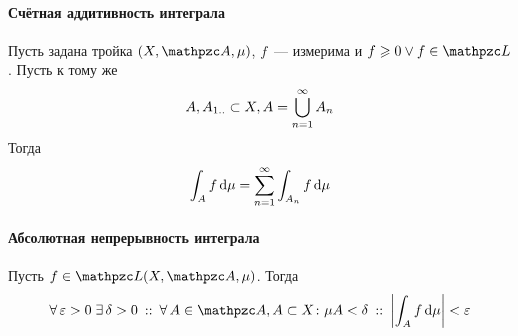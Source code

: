 \documentclass[12pt, timbord]{longnotes}
\begin{document}
\paragraph{Счётная аддитивность интеграла}
\begin{thrm}\label{thrm:meas::infadd}
  Пусть задана тройка $(X,\alg,\mu)$, $f$~--- измерима и $f \geqslant 0 \lor f \in \summb$. 
  Пусть к тому же 
  \[
    A, A_{1\intrng} \subset X, A = \bigcup_{n=1}^\infty A_n
  \]
  Тогда 
  \[
    \int _A f \, \mathrm{d} \mu = \sum_{n=1}^\infty \int _{A_n} f\, \mathrm{d} \mu 
  \]
\end{thrm}

\paragraph{Абсолютная непрерывность интеграла}
\begin{thrm}\label{thrm:meas::abscont}
  Пусть $f\in \summb(X,\alg,\mu)$. Тогда
  \[
    \forall\, \varepsilon > 0 \; \exists\, \delta > 0 \that \forall\, A \in \alg , A \subset X
    \colon \mu A < \delta \holds \left| \int_A f \, \del \mu \right| < \varepsilon 
  \]
\end{thrm}
\end{document}
